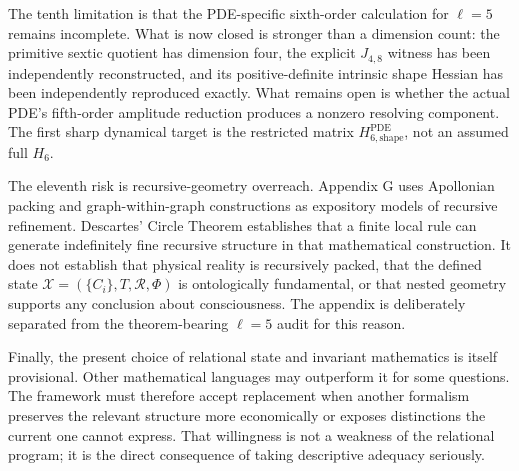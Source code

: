 The tenth limitation is that the PDE-specific sixth-order calculation for $\ell=5$ remains incomplete. What is now closed is stronger than a dimension count: the primitive sextic quotient has dimension four, the explicit $J_{4,8}$ witness has been independently reconstructed, and its positive-definite intrinsic shape Hessian has been independently reproduced exactly. What remains open is whether the actual PDE's fifth-order amplitude reduction produces a nonzero resolving component. The first sharp dynamical target is the restricted matrix $H_{6,\mathrm{shape}}^{\mathrm{PDE}}$, not an assumed full $H_6$.

The eleventh risk is recursive-geometry overreach. Appendix G uses Apollonian packing and graph-within-graph constructions as expository models of recursive refinement. Descartes' Circle Theorem establishes that a finite local rule can generate indefinitely fine recursive structure in that mathematical construction. It does not establish that physical reality is recursively packed, that the defined state $\mathcal X=(\{C_i\},T,\mathcal R,\Phi)$ is ontologically fundamental, or that nested geometry supports any conclusion about consciousness. The appendix is deliberately separated from the theorem-bearing $\ell=5$ audit for this reason.

Finally, the present choice of relational state and invariant mathematics is itself provisional. Other mathematical languages may outperform it for some questions. The framework must therefore accept replacement when another formalism preserves the relevant structure more economically or exposes distinctions the current one cannot express. That willingness is not a weakness of the relational program; it is the direct consequence of taking descriptive adequacy seriously.
